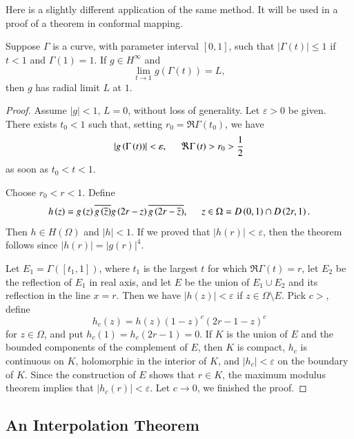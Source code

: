 Here is a slightly different application of the same method. It will be used in a proof of a theorem in conformal mapping.
\begin{theorem}
Suppose $\Gamma$ is a curve, with parameter interval $[0,1]$, such that $|\Gamma(t)|\le 1$ if $t<1$ and $\Gamma(1)=1$. If $g\in H^\infty$ and 
$$
\lim_{t\to 1}g(\Gamma(t))=L,
$$
then $g$ has radial limit $L$ at $1$.
\end{theorem}
\begin{proof}
Assume $|g|<1$, $L=0$, without loss of generality. Let $\varepsilon>0$ be given. There exists $t_0<1$ such that, setting $r_0=\Re\Gamma(t_0)$, we have 
$$
\left| g\left( \Gamma \left( t \right) \right) \right|<\varepsilon ,\hspace{0.5cm}\Re \Gamma \left( t \right) >r_0>\frac{1}{2}
$$
as soon as $t_0<t<1$.\par
Choose $r_0<r<1$. Define 
$$
h\left( z \right) =g\left( z \right) \overline{g\left( \overline{z} \right) }g\left( 2r-z \right) \overline{g\left( 2r-\overline{z} \right) },\hspace{0.5cm}z\in \Omega = D\left( 0,1 \right) \cap D\left( 2r,1 \right) .
$$
Then $h\in H(\Omega)$ and $|h|<1$. If we proved that $|h(r)|<\varepsilon$, then the theorem follows since $|h(r)|=|g(r)|^4$.\par
Let $E_1=\Gamma([t_1,1])$, where $t_1$ is the largest $t$ for which $\Re\Gamma(t)=r$, let $E_2$ be the reflection of $E_1$ in real axis, and let $E$ be the union of $E_1\cup E_2$ and its reflection in the line $x=r$. Then we have $|h(z)|<\varepsilon$ if $z\in\Omega\setminus E$. Pick $c>$, define 
$$
h_c\left( z \right) =h\left( z \right) \left( 1-z \right) ^c\left( 2r-1-z \right) ^c
$$
for $z\in\Omega$, and put $h_c(1)=h_c(2r-1)=0$. If $K$ is the union of $E$ and the bounded components of the complement of $E$, then $K$ is compact, $h_c$ is continuous on $K$, holomorphic in the interior of $K$, and $|h_c|<\varepsilon$ on the boundary of $K$. Since the construction of $E$ shows that $r\in K$, the maximum modulus theorem implies that $|h_c(r)|<\varepsilon$. Let $c\to 0$, we finished the proof.
\end{proof}
\subsection{An Interpolation Theorem}